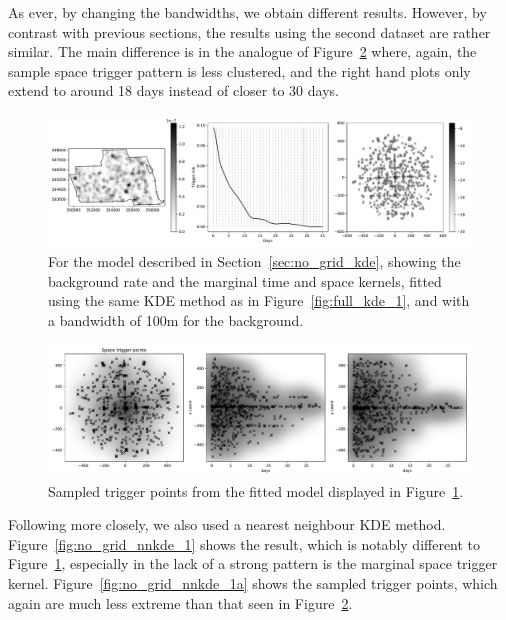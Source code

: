 \documentclass[twoside,a4paper]{article}
\theoremstyle{plain}
\theoremstyle{definition}
\begin{document}
As ever, by changing the bandwidths, we obtain different results.  However, by contrast
with previous sections, the results using the second dataset are rather similar. The main
difference is in the analogue of Figure~\ref{fig:no_grid_kde_1a} where, again, the sample
space trigger pattern is less clustered, and the right hand plots only extend to around 18 days
instead of closer to 30 days.

\begin{figure}
  \includegraphics[width=\textwidth]{../notebooks/no_grid_kde_1.pdf}
  \caption{For the model described in Section~\ref{sec:no_grid_kde}, showing the background
rate and the marginal time and space kernels, fitted using the same KDE method as in
Figure~\ref{fig:full_kde_1}, and with a bandwidth of 100m for the background.}
  \label{fig:no_grid_kde_1}
\end{figure}

\begin{figure}
  \includegraphics[width=\textwidth]{../notebooks/no_grid_kde_1a.pdf}
  \caption{Sampled trigger points from the fitted model displayed in
Figure~\ref{fig:no_grid_kde_1}.}
  \label{fig:no_grid_kde_1a}
\end{figure}

Following \cite{sepp2} more closely, we also used a nearest neighbour KDE method.
Figure~\ref{fig:no_grid_nnkde_1} shows the result, which is notably different to
Figure~\ref{fig:no_grid_kde_1}, especially in the lack of a strong pattern is the
marginal space trigger kernel.  Figure~\ref{fig:no_grid_nnkde_1a} shows the sampled
trigger points, which again are much less extreme than that seen in
Figure~\ref{fig:no_grid_kde_1a}.
\end{document}
